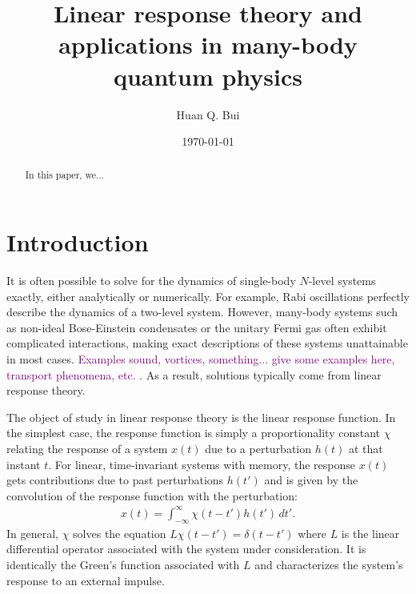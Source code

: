 \documentclass[reprint,
nofootinbib,
amsmath,amssymb,
aps]{revtex4-1}
\begin{document}
	
	

\title{Linear response theory and applications in many-body quantum physics}
\author{Huan Q. Bui}
\date{\today}


\begin{abstract}
	In this paper, we...
\end{abstract}

\maketitle


\section{Introduction}



It is often possible to solve for the dynamics of single-body $N$-level systems exactly, either analytically or numerically. For example, Rabi oscillations perfectly describe the dynamics of a two-level system. However, many-body systems such as non-ideal Bose-Einstein condensates or the unitary Fermi gas often exhibit complicated interactions, making exact descriptions of these systems unattainable in most cases. \textcolor{purple}{Examples sound, vortices, something... give some examples here, transport phenomena, etc. .} As a result, solutions typically come from linear response theory. 

The object of study in linear response theory is the linear response function. In the simplest case, the response function is simply a proportionality constant $\chi$ relating the response of a system $x(t)$ due to a perturbation $h(t)$ at that instant $t$. For linear, time-invariant systems with memory, the response $x(t)$ gets contributions due to past perturbations $h(t')$ and is given by the convolution of the response function with the perturbation:
\begin{align}\label{eq:linear_response}
x(t) = \int_{-\infty}^{\infty} \chi(t-t') h(t') \,dt'.
\end{align}
In general, $\chi$ solves the equation $ L \chi(t-t') = \delta(t-t')$ where $L$ is the linear differential operator associated with the system under consideration. It is identically the Green's function associated with $L$ and characterizes the system's response to an external impulse. 
\end{document}
